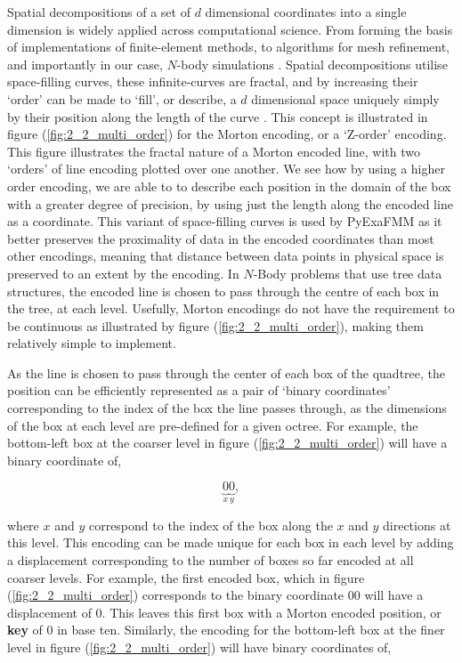 Spatial decompositions of a set of $d$ dimensional coordinates into a single
dimension is widely applied across computational science.
From forming the basis of implementations of finite-element methods, to algorithms
for mesh refinement, and importantly in our case, $N$-body simulations
\cite{Sundar:2008:SIAM}. Spatial decompositions utilise space-filling curves,
these infinite-curves are fractal, and by increasing their `order' can be made
to `fill', or describe, a $d$ dimensional space uniquely simply by their position
along the length of the curve \cite{Campbell:2003:Williams}. This concept is
illustrated in figure (\ref{fig:2_2_multi_order}) for the Morton encoding, or a
`Z-order' encoding.  This figure illustrates the fractal nature of a Morton
encoded line, with two `orders' of line encoding plotted over one another. We see
how by using a higher order encoding, we are able to to describe each position
in the domain of the box with a greater degree of precision, by using just
the length along the encoded line as a coordinate. This variant of space-filling
curves is used by \gls{PyExaFMM} as it better preserves the proximality of data
in the encoded coordinates than most other encodings, meaning that distance
between data points in physical space is preserved to an extent by the encoding. In $N$-Body
problems that use tree data structures, the encoded line is chosen to pass through
the centre of each box in the tree, at each level. Usefully, Morton encodings
do not have the requirement to be continuous as illustrated by figure
(\ref{fig:2_2_multi_order}), making them relatively simple to implement.

As the line is chosen to pass through the center of each box of the quadtree,
 the position can be efficiently represented
 as a pair of `binary coordinates' corresponding to the index of the box the line
 passes through, as the dimensions of the box at each level are pre-defined for a
 given octree. For example, the bottom-left box at the coarser level in figure (\ref{fig:2_2_multi_order})
 will have a binary coordinate of,

 \begin{equation}
     \underbrace{0}_{x}\underbrace{0}_{y},
 \end{equation}

 where $x$ and $y$ correspond to the index of the box along the $x$ and $y$
 directions at this level. This encoding can be made unique for each
 box in each level by adding a displacement corresponding to the number of boxes so far
 encoded at all coarser levels. For example, the first encoded box, which in figure (\ref{fig:2_2_multi_order})
 corresponds to the binary coordinate $00$ will have a displacement of 0.
 This leaves this first box with a Morton encoded position, or \textbf{\gls{key}}
 of 0 in base ten. Similarly, the encoding for the bottom-left box at the finer
 level in figure (\ref{fig:2_2_multi_order}) will have binary coordinates of,

